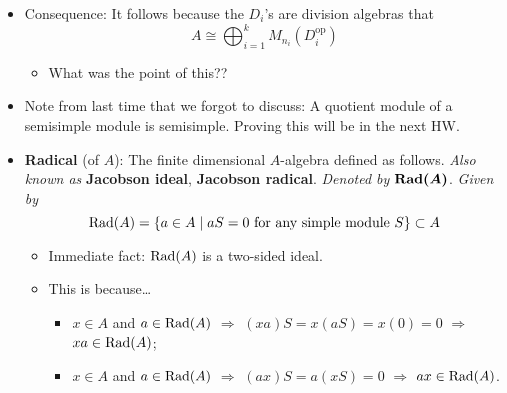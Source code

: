 \documentclass[../notes.tex]{subfiles}
\begin{document}
\begin{itemize}
\begin{proof}
        \begin{equation*}
            \Hom_A(S_i,S_j) =
            \begin{cases}
                0 & i\neq j\\
                D_i & i=j
            \end{cases}
        \end{equation*}
        where each $D_i$ is a division algebra. Thus, continuing from the above,
        \begin{equation*}
            A^\text{op} \cong \bigoplus_{i=1}^k\Hom_A(S_i^{n_i},S_i^{n_i})
            = \bigoplus_{i=1}^kM_{n_i}(\Hom_A(S_i,S_i))
            = \bigoplus_{i=1}^kM_{n_i}(D_i)
        \end{equation*}
    \end{proof}
    \item Consequence: It follows because the $D_i$'s are division algebras that
    \begin{equation*}
        A \cong \bigoplus_{i=1}^kM_{n_i}(D_i^\text{op})
    \end{equation*}
    \begin{itemize}
        \item What was the point of this??
    \end{itemize}
    \item Note from last time that we forgot to discuss: A quotient module of a semisimple module is semisimple. Proving this will be in the next HW.
    \item \textbf{Radical} (of $A$): The finite dimensional $A$-algebra defined as follows. \emph{Also known as} \textbf{Jacobson ideal}, \textbf{Jacobson radical}. %
    \emph{Denoted by} $\bm{\Rad(A)}$. \emph{Given by}
    \begin{equation*}
        \operatorname{Rad}(A) = \{a\in A\mid aS=0\text{ for any simple module }S\} \subset A
    \end{equation*}
    \begin{itemize}
        \item Immediate fact: $\operatorname{Rad}(A)$ is a two-sided ideal.
        \item This is because\dots
        \begin{itemize}
            \item $x\in A$ and $a\in\operatorname{Rad}(A)$ $\Longrightarrow$ $(xa)S=x(aS)=x(0)=0$ $\Longrightarrow$ $xa\in\operatorname{Rad}(A)$;
            \item $x\in A$ and $a\in\operatorname{Rad}(A)$ $\Longrightarrow$ $(ax)S=a(xS)=0$ $\Longrightarrow$ $ax\in\operatorname{Rad}(A)$.

\end{itemize}
\end{itemize}
\end{itemize}
\end{document}
